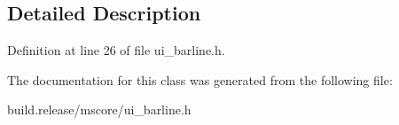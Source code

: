 \subsection{Detailed Description}


Definition at line 26 of file ui\+\_\+barline.\+h.



The documentation for this class was generated from the following file\+:\begin{DoxyCompactItemize}
\item 
build.\+release/mscore/ui\+\_\+barline.\+h\end{DoxyCompactItemize}
